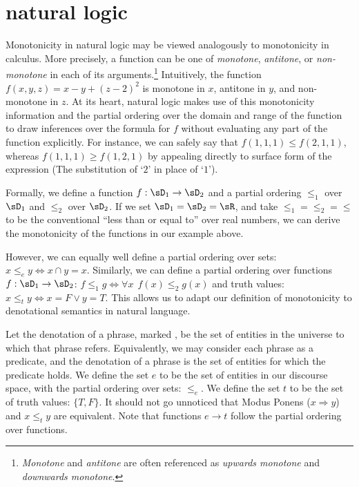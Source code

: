 \chapter{natural logic}

%
%
Monotonicity in natural logic may be viewed analogously to monotonicity
  in calculus.
More precisely, a function can be one of \textit{monotone},
  \textit{antitone}, or \textit{non-monotone} in each of its
  arguments.\footnote{
    \textit{Monotone} and \textit{antitone} are often referenced
    as \textit{upwards monotone} and \textit{downwards monotone}.
  }
Intuitively, the function $f(x,y,z) = x - y + (z-2)^2$ is
  monotone in $x$, antitone in $y$, and non-monotone in $z$.
At its heart, natural logic makes use of this monotonicity information
  and the partial ordering over the domain and range of the function
  to draw inferences over the formula for $f$ without evaluating
  any part of the function explicitly.
For instance, we can safely say that $f(1,1,1) \leq f(2,1,1)$, whereas
  $f(1,1,1) \geq f(1,2,1)$ by appealing directly to surface form of
  the expression (The substitution of `$2$' in place of `$1$').

Formally, we define a function $f:\sD_1 \rightarrow \sD_2$ and a partial
  ordering $\le_1$ over $\sD_1$ and $\le_2$ over $\sD_2$.
If we set $\sD_1 = \sD_2 = \sR$, and take $\le_1 = \le_2 = \le$ to be
  the conventional ``less than or equal to'' over real numbers,
  we can derive the monotonicity of the functions in our example above.

However, we can equally well define a partial ordering over sets:
  $x \le_e y \Leftrightarrow x \cap y = x$.
Similarly, we can define a partial ordering over functions
  $f : \sD_1 \rightarrow \sD_2$:
  $f \le_1 g \Leftrightarrow \forall x ~~ f(x) \leq_2 g(x)$
  and truth values:
  $x \le_t y \Leftrightarrow x = F \lor y = T$.
This allows us to adapt our definition of monotonicity to denotational
  semantics in natural language.

Let the denotation of a phrase, marked \denote{\cdot}, be the set of
  entities in the universe to which that phrase refers.
Equivalently, we may consider each phrase as a predicate, and the denotation
  of a phrase is the set of entities for which the predicate holds.
We define the set $e$ to be the set of entities in our discourse space,
  with the partial ordering over sets: $\le_e$.
We define the set $t$ to be the set of truth values: $\{T, F\}$.
It should not go unnoticed that Modus Ponens ($x \Rightarrow y$)
  and $x \le_t y$ are equivalent.
Note that functions $e \rightarrow t$ follow the partial ordering over
  functions.

